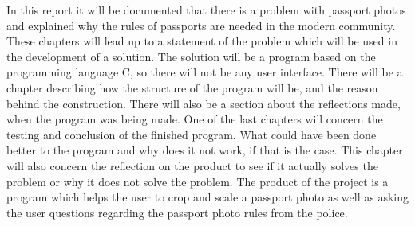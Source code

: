 In this report it will be documented that there is a problem with passport photos and explained why the rules of passports are needed in the modern community. These chapters will lead up to a statement of the problem which will be used in the development of a solution.
\newline
The solution will be a program based on the programming language C, so there will not be any user interface. There will be a chapter describing how the structure of the program will be, and the reason behind the construction. There will also be a section about the reflections made, when the program was being made.
\newline
One of the last chapters will concern the testing and conclusion of the finished program. What could have been done better to the program and why does it not work, if that is the case. This chapter will also concern the reflection on the product to see if it actually solves the problem or why it does not solve the problem.
\newline
The product of the project is a program which helps the user to crop and scale a passport photo as well as asking the user questions regarding the passport photo rules from the police. 
